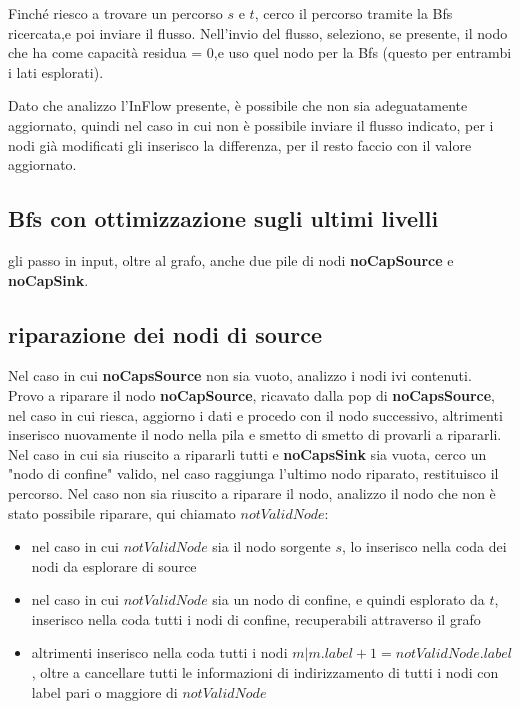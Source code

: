 \documentclass{article}
\begin{document}
Finché riesco a trovare un percorso $s$ e $t$, cerco il percorso tramite la Bfs ricercata,e poi inviare il flusso.
Nell'invio del flusso, seleziono, se presente, il nodo che ha come capacità residua = 0,e uso quel nodo per la Bfs (questo per entrambi i lati esplorati).

Dato che analizzo l'InFlow presente, è possibile che non sia adeguatamente aggiornato, quindi nel caso in cui non è possibile inviare il flusso indicato, per i nodi già modificati gli inserisco la differenza, per il resto faccio con il valore aggiornato.

\subsection{Bfs con ottimizzazione sugli ultimi livelli}
gli passo in input, oltre al grafo, anche due  pile di nodi \textbf{noCapSource} e \textbf{noCapSink}.

\subsection{riparazione dei nodi di source}
Nel caso in cui \textbf{noCapsSource} non sia vuoto, analizzo i nodi ivi contenuti.
Provo a riparare il nodo \textbf{noCapSource}, ricavato dalla pop di \textbf{noCapsSource},
nel caso in cui riesca, aggiorno i dati e procedo con il nodo successivo,
altrimenti inserisco nuovamente il nodo nella pila e smetto di smetto di provarli a ripararli.
Nel caso in cui sia riuscito a ripararli tutti e \textbf{noCapsSink} sia vuota,
cerco un "nodo di confine" valido, nel caso raggiunga l'ultimo nodo riparato, restituisco il percorso.
Nel caso non sia riuscito a riparare il nodo, analizzo il nodo che non è stato possibile riparare, qui chiamato $notValidNode$:
\begin{itemize}
    \item nel caso in cui $notValidNode$ sia il nodo sorgente $s$, lo inserisco nella coda dei nodi da esplorare di source
    \item nel caso in cui $notValidNode$ sia un nodo di confine, e quindi esplorato da $t$, inserisco nella coda tutti i nodi di confine, recuperabili attraverso il grafo
    \item altrimenti inserisco nella coda tutti i nodi $m | m.label +1 = notValidNode.label$, oltre a cancellare tutti le informazioni di indirizzamento di tutti i nodi con label pari o maggiore di $notValidNode$
\end{itemize}
\end{document}
